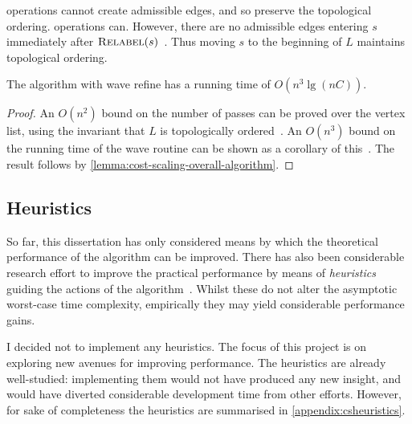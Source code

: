  operations cannot create admissible edges, and so preserve the topological ordering.  operations can. However, there are no admissible edges entering $s$ immediately after $\textproc{Relabel}(s)$~\cite[lemma~6.5]{Goldberg:1987}. Thus moving $s$ to the beginning of $L$ maintains topological ordering.\\

\begin{thm} \label{thm:cost-scaling-wave-complexity}
The algorithm with wave refine has a running time of $O(n^3 \lg (nC))$.
\end{thm}
\begin{proof}
An $O(n^2)$ bound on the number of passes can be proved over the vertex list, using the invariant that $L$ is topologically ordered~\cite[lemma~7.3]{Goldberg:1987}. An $O(n^3)$ bound on the running time of the wave  routine can be shown as a corollary of this~\cite[theorem~7.4]{Goldberg:1987}. The result follows by \cref{lemma:cost-scaling-overall-algorithm}.
\end{proof}


\subsection{Heuristics}

So far, this dissertation has only considered means by which the theoretical performance of the algorithm can be improved. There has also been considerable research effort to improve the practical performance by means of \emph{heuristics} guiding the actions of the algorithm~\cite{Goldberg:1997}. Whilst these do not alter the asymptotic worst-case time complexity, empirically they may yield considerable performance gains.

I decided not to implement any heuristics. The focus of this project is on exploring new avenues for improving performance. The heuristics are already well-studied: implementing them would not have produced any new insight, and would have diverted considerable development time from other efforts. However, for sake of completeness the heuristics are summarised in \cref{appendix:csheuristics}.

